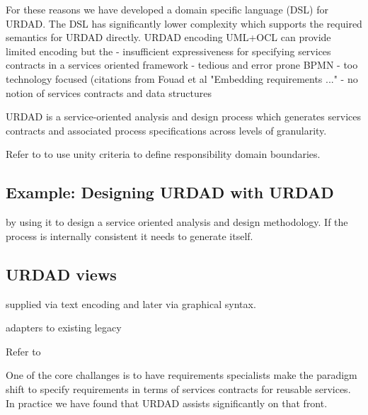 For these reasons we have developed a domain specific language (DSL) for URDAD. The DSL has significantly lower complexity which supports the required semantics for URDAD directly. 
URDAD encoding
UML+OCL can provide limited encoding but the
  - insufficient expressiveness for specifying services contracts in a services oriented framework
  - tedious and error prone
BPMN
  - too technology focused (citations from Fouad et al "Embedding requirements ..."
  - no notion of services contracts and data structures  

URDAD is a service-oriented analysis and design process which generates services contracts and associated process specifications across levels of granularity. 

Refer to \cite{gonzalez_unity_2009} to use unity criteria to define responsibility domain boundaries.

\subsection{Example: Designing URDAD with URDAD}
by using it to design a service oriented analysis and design methodology. If the process is internally consistent it needs to generate itself. 

\subsection{URDAD views}

supplied via text encoding and later via graphical syntax.


adapters to existing legacy


Refer to \cite{wirfs-brock_object-oriented_1989}

One of the core challanges is to have requirements specialists make the paradigm shift to specify requirements in terms of services contracts for reusable services\cite{haines_impact_2007}. In practice we have found that URDAD assists significantly on that front.
